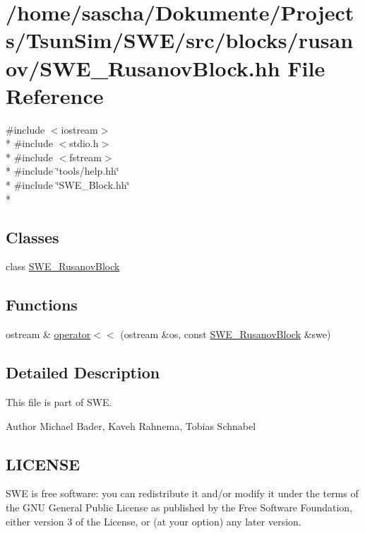 \hypertarget{SWE__RusanovBlock_8hh}{\section{/home/sascha/\-Dokumente/\-Projects/\-Tsun\-Sim/\-S\-W\-E/src/blocks/rusanov/\-S\-W\-E\-\_\-\-Rusanov\-Block.hh File Reference}
\label{SWE__RusanovBlock_8hh}
}
{\ttfamily \#include $<$iostream$>$}\\*
{\ttfamily \#include $<$stdio.\-h$>$}\\*
{\ttfamily \#include $<$fstream$>$}\\*
{\ttfamily \#include \char`\"{}tools/help.\-hh\char`\"{}}\\*
{\ttfamily \#include \char`\"{}S\-W\-E\-\_\-\-Block.\-hh\char`\"{}}\\*
\subsection*{Classes}
\begin{DoxyCompactItemize}
\item 
class \hyperlink{classSWE__RusanovBlock}{S\-W\-E\-\_\-\-Rusanov\-Block}
\end{DoxyCompactItemize}
\subsection*{Functions}
\begin{DoxyCompactItemize}
\item 
ostream \& \hyperlink{SWE__RusanovBlock_8hh_a11f96afabd5e590e50d491568b96503a}{operator$<$$<$} (ostream \&os, const \hyperlink{classSWE__RusanovBlock}{S\-W\-E\-\_\-\-Rusanov\-Block} \&swe)
\end{DoxyCompactItemize}


\subsection{Detailed Description}
This file is part of S\-W\-E.

\begin{DoxyAuthor}{Author}
Michael Bader, Kaveh Rahnema, Tobias Schnabel
\end{DoxyAuthor}
\hypertarget{Writer_8hh_LICENSE}{}\subsection{L\-I\-C\-E\-N\-S\-E}\label{Writer_8hh_LICENSE}
S\-W\-E is free software\-: you can redistribute it and/or modify it under the terms of the G\-N\-U General Public License as published by the Free Software Foundation, either version 3 of the License, or (at your option) any later version.


